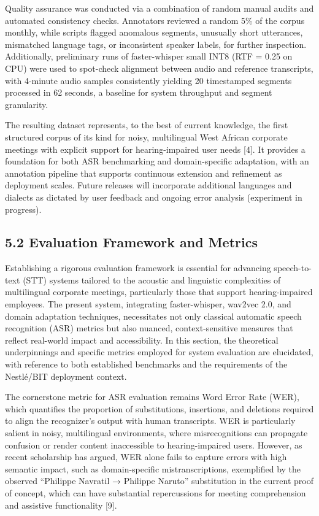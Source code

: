 \documentclass[12pt,a4paper]{article}
\begin{document}
Quality assurance was conducted via a combination of random manual audits and automated consistency checks. Annotators reviewed a random 5\% of the corpus monthly, while scripts flagged anomalous segments, unusually short utterances, mismatched language tags, or inconsistent speaker labels, for further inspection. Additionally, preliminary runs of faster-whisper small INT8 (RTF = 0.25 on CPU) were used to spot-check alignment between audio and reference transcripts, with 4-minute audio samples consistently yielding 20 timestamped segments processed in 62 seconds, a baseline for system throughput and segment granularity.


The resulting dataset represents, to the best of current knowledge, the first structured corpus of its kind for noisy, multilingual West African corporate meetings with explicit support for hearing-impaired user needs [4]. It provides a foundation for both ASR benchmarking and domain-specific adaptation, with an annotation pipeline that supports continuous extension and refinement as deployment scales. Future releases will incorporate additional languages and dialects as dictated by user feedback and ongoing error analysis (experiment in progress).


\subsection{5.2 Evaluation Framework and Metrics}


Establishing a rigorous evaluation framework is essential for advancing speech-to-text (STT) systems tailored to the acoustic and linguistic complexities of multilingual corporate meetings, particularly those that support hearing-impaired employees. The present system, integrating faster-whisper, wav2vec 2.0, and domain adaptation techniques, necessitates not only classical automatic speech recognition (ASR) metrics but also nuanced, context-sensitive measures that reflect real-world impact and accessibility. In this section, the theoretical underpinnings and specific metrics employed for system evaluation are elucidated, with reference to both established benchmarks and the requirements of the Nestlé/BIT deployment context.


The cornerstone metric for ASR evaluation remains Word Error Rate (WER), which quantifies the proportion of substitutions, insertions, and deletions required to align the recognizer’s output with human transcripts. WER is particularly salient in noisy, multilingual environments, where misrecognitions can propagate confusion or render content inaccessible to hearing-impaired users. However, as recent scholarship has argued, WER alone fails to capture errors with high semantic impact, such as domain-specific mistranscriptions, exemplified by the observed “Philippe Navratil → Philippe Naruto” substitution in the current proof of concept, which can have substantial repercussions for meeting comprehension and assistive functionality [9].
\end{document}
